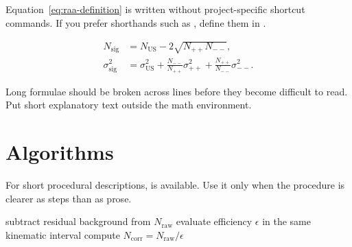 Equation~\ref{eq:raa-definition} is written without project-specific shortcut
commands. If you prefer shorthands such as , define them in
.

\begin{align}
  N_{\mathrm{sig}} &= N_{\mathrm{US}} - 2\sqrt{N_{++}N_{--}}, \\
  \sigma_{\mathrm{sig}}^{2} &= \sigma_{\mathrm{US}}^{2}
    + \frac{N_{--}}{N_{++}}\sigma_{++}^{2}
    + \frac{N_{++}}{N_{--}}\sigma_{--}^{2}.
  \label{eq:like-sign-subtraction}
\end{align}

Long formulae should be broken across lines before they become difficult to
read. Put short explanatory text outside the math environment.

\section{Algorithms}

For short procedural descriptions,  is available. Use it only
when the procedure is clearer as steps than as prose.

\begin{algorithm}[htbp]
  \caption{Minimal correction workflow}
  \label{alg:correction-example}
  subtract residual background from $N_{\mathrm{raw}}$\;
  evaluate efficiency $\epsilon$ in the same kinematic interval\;
  compute $N_{\mathrm{corr}} = N_{\mathrm{raw}} / \epsilon$\;
\end{algorithm}
